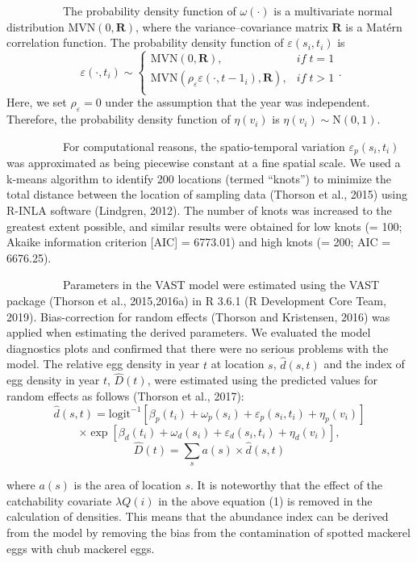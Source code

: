 \documentclass[12pt]{article}
\begin{document}
\begin{linenumbers}
{\ \ \ \ \ \ \ \ \ \
The probability density function of $\omega(\cdot)$ is a multivariate normal distribution $\mathrm{MVN}(0, \mathbf{R})$, where the variance--covariance matrix $\mathbf{R}$ is a Mat\'{e}rn correlation function. The probability density function of $\varepsilon(s_{i}, t_{i})$ is
\[\
\varepsilon(\cdot, t_{i}) \sim \left\{
\begin{array}{ll}
\mathrm{MVN}(0, \mathbf{R}), &if \;t = 1\\
\mathrm{MVN}(\rho_{\varepsilon} \varepsilon(\cdot, t-1_{i}), \mathbf{R}), &if \;t > 1 \\
\end{array} \right.
. \]
Here, we set $\rho_{\varepsilon} = 0$ under the assumption that the year was independent. Therefore, the probability density function of $\eta(v_{i})$ is $\eta(v_{i}) \sim \mathrm{N}(0, 1)$.

\ \ \ \ \ \ \ \ \ \
For computational reasons, the spatio-temporal variation $\varepsilon_{p}(s_{i}, t_{i})$ was approximated as being piecewise constant at a fine spatial scale. We used a k-means algorithm to identify 200 locations (termed ``knots'') to minimize the total distance between the location of sampling data (Thorson et al., 2015) using R-INLA software (Lindgren, 2012). The number of knots was increased to the greatest extent possible, and similar results were obtained for low knots (= 100; Akaike information criterion [AIC] = 6773.01) and high knots (= 200; AIC = 6676.25).

\ \ \ \ \ \ \ \ \ \
Parameters in the VAST model were estimated using the VAST package (Thorson et al., 2015,2016a) in R 3.6.1 (R Development Core Team, 2019). Bias-correction for random effects (Thorson and Kristensen, 2016) was applied when estimating the derived parameters. We evaluated the model diagnostics plots and confirmed that there were no serious problems with the model. The relative egg density in year $t$ at location $s$, $\hat{d}(s, t)$ and the index of egg density in year $t$, $\hat{D}(t)$, were estimated using the predicted values for random effects as follows (Thorson et al., 2017):
\newpage
\[
\hat{d}(s, t) = \mathrm{logit}^{-1}[\beta_{p}(t_{i}) + \omega_{p}(s_{i}) + \varepsilon_{p}(s_{i}, t_{i}) + \eta_{p}(v_{i})]
\]
\[
\times \exp[\beta_{d}(t_{i}) + \omega_{d}(s_{i}) + \varepsilon_{d}(s_{i}, t_{i}) + \eta_{d}(v_{i})],
\]
\[\hat{D}(t) = \sum_{s} a(s) \times \hat{d}(s, t)
\]

where $a (s)$ is the area of location $s$. It is noteworthy that  the effect of the catchability covariate $\lambda Q(i)$ in the above equation (1) is removed in the calculation of densities. This means that the abundance index can be derived from the model by removing the bias from the contamination of spotted mackerel eggs with chub mackerel eggs.

}
\end{linenumbers}
\end{document}
